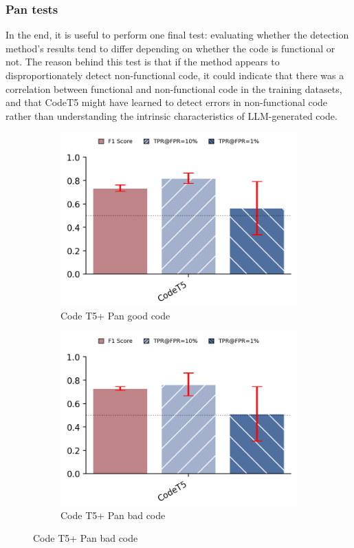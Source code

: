 \subsubsection{Pan tests}
In the end, it is useful to perform one final test: 
evaluating whether the detection method's results tend to 
differ depending on whether the code is functional or not. 
The reason behind this test is that if the method appears to 
disproportionately detect non-functional code, it could indicate 
that there was a correlation between functional and non-functional 
code in the training datasets, and that CodeT5 might have learned 
to detect errors in non-functional code rather than understanding 
the intrinsic characteristics of LLM-generated code.


\begin{figure}[H]
    \begin{subfigure}[b]{0.4\textwidth}
        \centering
        \includegraphics[width=\linewidth]{img/panok.png}
        \caption{Code T5+ Pan good code}
        \label{fig:ffesfe6}
    \end{subfigure}
    \hfill
    \begin{subfigure}[b]{0.4\textwidth}
        \centering
        \includegraphics[width=\linewidth]{img/panwrong.png}
        \caption{Code T5+ Pan bad code}
        \label{fig:bfseds6}
    \end{subfigure}
\end{figure}
